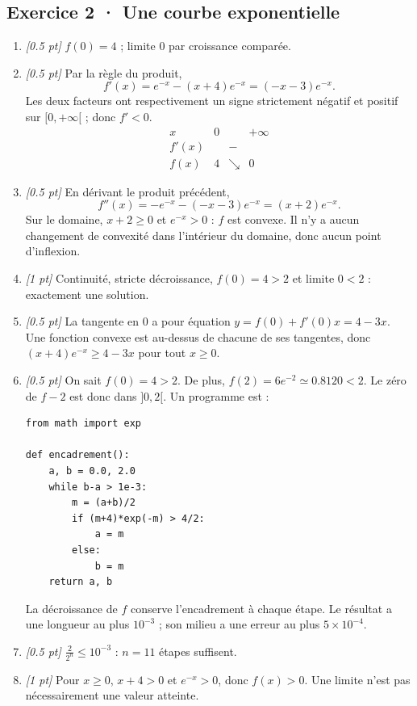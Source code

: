 \subsection*{Exercice 2 · Une courbe exponentielle}\begin{enumerate}

\item \textit{[\num{0,5} pt]} $f(0)=4$ ; limite $0$ par croissance comparée.

\item \textit{[\num{0,5} pt]} Par la règle du produit,
\[f'(x)=e^{-x}-(x+4)e^{-x}=(-x-3)e^{-x}.\]
Les deux facteurs ont respectivement un signe strictement négatif et positif sur $[0,+\infty[$ ; donc $f'<0$.
\[\begin{array}{c|ccc}x&0&&+\infty\\\hline f'(x)&&-&\\\hline f(x)&4&\searrow&0\end{array}\]

\item \textit{[\num{0,5} pt]} En dérivant le produit précédent,
\[f''(x)=-e^{-x}-(-x-3)e^{-x}=(x+2)e^{-x}.\]
Sur le domaine, $x+2\ge0$ et $e^{-x}>0$ : $f$ est convexe. Il n'y a aucun changement de convexité dans l'intérieur du domaine, donc aucun point d'inflexion.

\item \textit{[1 pt]} Continuité, stricte décroissance, $f(0)=4>2$ et limite $0<2$ : exactement une solution.

\item \textit{[\num{0,5} pt]} La tangente en $0$ a pour équation $y=f(0)+f'(0)x=4-3x$. Une fonction convexe est au-dessus de chacune de ses tangentes, donc $(x+4)e^{-x}\ge 4-3x$ pour tout $x\ge0$.


\item \textit{[\num{0,5} pt]} On sait $f(0)=4>2$. De plus, $f(2)=6e^{-2}\simeq\num{0,8120}<2$. Le zéro de $f-2$ est donc dans $]0,2[$. Un programme est :
\begin{lstlisting}
from math import exp

def encadrement():
    a, b = 0.0, 2.0
    while b-a > 1e-3:
        m = (a+b)/2
        if (m+4)*exp(-m) > 4/2:
            a = m
        else:
            b = m
    return a, b
\end{lstlisting}
La décroissance de $f$ conserve l'encadrement à chaque étape. Le résultat a une longueur au plus $10^{-3}$ ; son milieu a une erreur au plus $5\times10^{-4}$.

\item \textit{[\num{0,5} pt]} $\frac{2}{2^n}\le10^{-3}$ : $n=11$ étapes suffisent.

\item \textit{[1 pt]} Pour $x\ge0$, $x+4>0$ et $e^{-x}>0$, donc $f(x)>0$. Une limite n'est pas nécessairement une valeur atteinte.

\end{enumerate}

